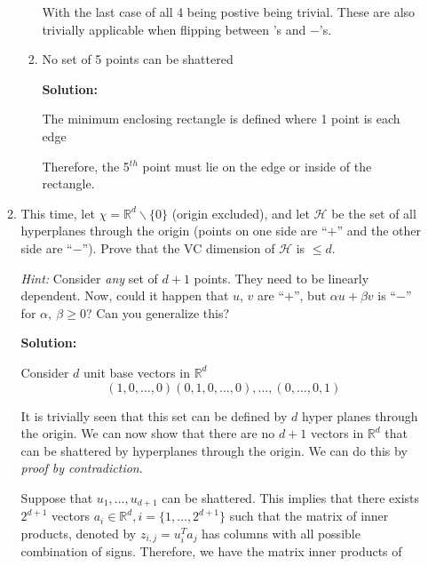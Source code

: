 \documentclass[12pt]{article}
\begin{document}
\begin{enumerate}
\begin{enumerate}
\begin{enumerate}
With the last case of all 4 being postive being trivial. These are also trivially applicable when flipping between {\color{red}{$+$}}'s and $-$'s.

\item No set of 5 points can be shattered

{\bf Solution:}

The minimum enclosing rectangle is defined where 1 point is each edge


Therefore, the 5$^{th}$ point must lie on the edge or inside of the rectangle.

\end{enumerate}

\item This time, let $\chi = \mathbb{R}^{d}\backslash \{0\}$ (origin excluded), and let $\mathcal{H}$ be the set of all hyperplanes through the origin (points on one side are ``$+$'' and the other side are ``$-$''). Prove that the VC dimension of $\mathcal{H}$ is $\leq d$.

{\em Hint:} Consider {\em any} set of $d + 1$ points. They need to be linearly dependent. Now, could it happen that $u$, $v$ are ``$+$'', but $\alpha u + \beta v$ is ``$-$'' for $\alpha,\ \beta\geq 0$? Can you generalize this?

{\bf Solution:}

Consider $d$ unit base vectors in $\mathbb{R}^{d}$
\[
  (1,0,\ldots,0)(0,1,0,\ldots,0),\ldots,(0,\ldots,0,1)
\]

It is trivially seen that this set can be defined by $d$ hyper planes through the origin. We can now show that there are no $d+1$ vectors in $\mathbb{R}^{d}$ that can be shattered by hyperplanes through the origin. We can do this by {\em proof by contradiction}.

Suppose that $u_{1},\ldots,u_{d+1}$ can be shattered. This implies that there exists $2^{d+1}$ vectors $a_{i} \in \mathbb{R}^{d}, i = \{1,\ldots,2^{d+1}\}$ such that the matrix of inner products, denoted by $z_{i,j} = u_{i}^{T}a_{j}$ has columns with all possible combination of signs. Therefore, we have the matrix inner products of


\end{enumerate}
\end{enumerate}
\end{document}
